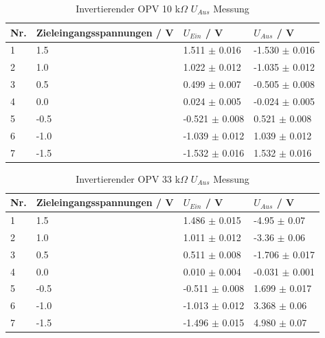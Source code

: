 \documentclass[12pt,a4paper,twoside]{article}
\begin{document}
\begin{table}[H]
    \centering
    \caption{Invertierender OPV 10 k$\Omega$ $U_{Aus}$ Messung}
    \label{tab:IoVerstärkungenGemessen10}
    \begin{tabular}{| l | l | l | l |}
        \hline
        Nr. & Zieleingangsspannungen / V & $U_{Ein}$ / V & $U_{Aus}$ / V \\
        \hline
        1 &  1.5 &  1.511 $\pm$ 0.016 & -1.530 $\pm$ 0.016 \\
        2 &  1.0 &  1.022 $\pm$ 0.012 & -1.035 $\pm$ 0.012 \\
        3 &  0.5 &  0.499 $\pm$ 0.007 & -0.505 $\pm$ 0.008 \\
        4 &  0.0 &  0.024 $\pm$ 0.005 & -0.024 $\pm$ 0.005 \\
        5 & -0.5 & -0.521 $\pm$ 0.008 &  0.521 $\pm$ 0.008 \\
        6 & -1.0 & -1.039 $\pm$ 0.012 &  1.039 $\pm$ 0.012 \\
        7 & -1.5 & -1.532 $\pm$ 0.016 &  1.532 $\pm$ 0.016 \\
        \hline
    \end{tabular}
\end{table}

\begin{table}[H]
    \centering
    \caption{Invertierender OPV 33 k$\Omega$ $U_{Aus}$ Messung}
    \label{tab:IoVerstärkungenGemessen33}
    \begin{tabular}{| l | l | l | l |}
        \hline
        Nr. & Zieleingangsspannungen / V & $U_{Ein}$ / V & $U_{Aus}$ / V \\
        \hline
        1 &  1.5 &  1.486 $\pm$ 0.015 & -4.95  $\pm$  0.07 \\
        2 &  1.0 &  1.011 $\pm$ 0.012 & -3.36  $\pm$  0.06 \\
        3 &  0.5 &  0.511 $\pm$ 0.008 & -1.706 $\pm$ 0.017 \\
        4 &  0.0 &  0.010 $\pm$ 0.004 & -0.031 $\pm$ 0.001 \\
        5 & -0.5 & -0.511 $\pm$ 0.008 &  1.699 $\pm$ 0.017 \\
        6 & -1.0 & -1.013 $\pm$ 0.012 &  3.368 $\pm$ 0.06  \\
        7 & -1.5 & -1.496 $\pm$ 0.015 &  4.980 $\pm$ 0.07  \\
        \hline
    \end{tabular}
\end{table}
\end{document}
